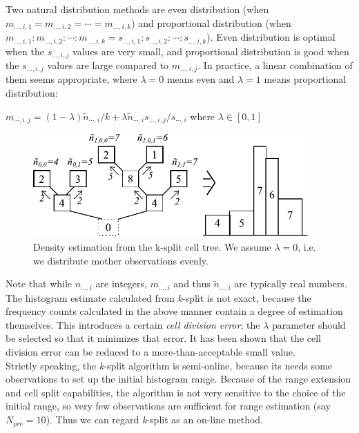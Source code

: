 
Two natural distribution methods are even
distribution (when
$m_{...,i,1} = m_{...,i,2} = \cdots = m_{...,i,k}$) and proportional
distribution (when
$m_{...,i,1} : m_{...,i,2} : \cdots : m_{...,i,k} = s_{...,i,1} : s_{...,i,2} : \cdots : s_{...,i,k}$).
Even distribution is optimal when the
$s_{...,i,j}$ values are very small, and proportional distribution is
good when the $s_{...,i,j}$ values are large compared to
$m_{...,i,j}$. In practice, a linear combination of them seems
appropriate, where $\lambda=0$ means even and $\lambda=1$ means
proportional distribution:


$m_{\cdots,i,j} = (1-\lambda)\tilde{n}_{\cdots,i}/k + \lambda \tilde{n}_{\cdots,i} s_{...,i,j} / s_{\cdots,i}$
where $\lambda\in[0,1]$

\begin{figure}[htbp]
  \begin{center}
    \includegraphics[width=4.147in, height=1.567in]{figures/usmanFig16}
    \caption{Density estimation from the k-split cell tree. We
      assume $\lambda=0$, i.e. we distribute mother observations
      evenly.}
  \end{center}
\end{figure}


Note that while $n_{...,i}$ are integers, $m_{...,i}$ and thus
$\tilde{n}_{...,i}$ are typically real numbers. The histogram estimate
calculated from \textit{k}-split is not exact, because the frequency
counts calculated in the above manner contain a degree of estimation
themselves. This introduces a certain \textit{cell division error};
the $\lambda$ parameter should be selected so that it minimizes that
error. It has been shown that the cell division error can
be reduced to a more-than-acceptable small value.\\
Strictly speaking, the \textit{k}-split algorithm is semi-online,
because its needs some observations to set up the initial histogram
range.  Because of the range extension and cell split
capabilities, the algorithm is not very sensitive to the choice of the
initial range, so very few observations are sufficient for range
estimation (say $N_{pre}=10$). Thus we can regard \textit{k}-split as
an on-line method.

